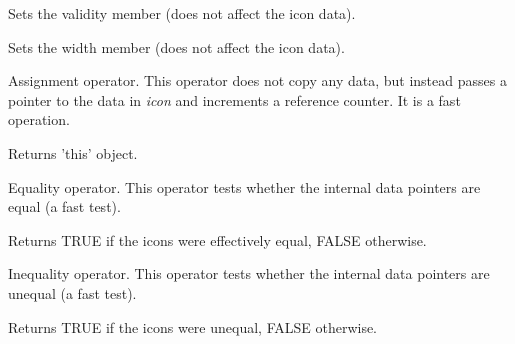 



Sets the validity member (does not affect the icon data).





Sets the width member (does not affect the icon data).





Assignment operator. This operator does not copy any data, but instead
passes a pointer to the data in {\it icon} and increments a reference
counter. It is a fast operation.




Returns 'this' object.



Equality operator. This operator tests whether the internal data pointers are
equal (a fast test).




Returns TRUE if the icons were effectively equal, FALSE otherwise.



Inequality operator. This operator tests whether the internal data pointers are
unequal (a fast test).




Returns TRUE if the icons were unequal, FALSE otherwise.


